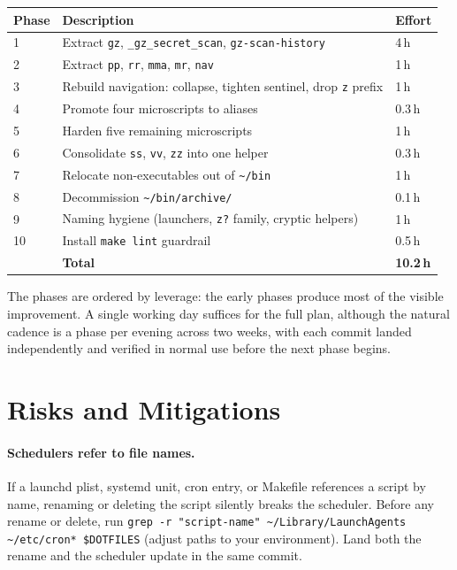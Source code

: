 \documentclass[11pt,letterpaper]{scrartcl}
\begin{document}
\begin{longtable}{@{}lll@{}}
  \toprule
  \textbf{Phase} & \textbf{Description}                                  & \textbf{Effort} \\
  \midrule
  1 & Extract \texttt{gz}, \texttt{\_gz\_secret\_scan}, \texttt{gz-scan-history} & 4\,h            \\
  2 & Extract \texttt{pp}, \texttt{rr}, \texttt{mma}, \texttt{mr}, \texttt{nav}  & 1\,h            \\
  3 & Rebuild navigation: collapse, tighten sentinel, drop \texttt{z} prefix     & 1\,h            \\
  4 & Promote four microscripts to aliases                                       & 0.3\,h          \\
  5 & Harden five remaining microscripts                                         & 1\,h            \\
  6 & Consolidate \texttt{ss}, \texttt{vv}, \texttt{zz} into one helper          & 0.3\,h          \\
  7 & Relocate non-executables out of \texttt{\textasciitilde/bin}               & 1\,h            \\
  8 & Decommission \texttt{\textasciitilde/bin/archive/}                         & 0.1\,h          \\
  9 & Naming hygiene (launchers, \texttt{z?} family, cryptic helpers)            & 1\,h            \\
  10 & Install \texttt{make lint} guardrail                                      & 0.5\,h          \\
  \midrule
    & \textbf{Total}                                                             & \textbf{10.2\,h} \\
  \bottomrule
\end{longtable}

The phases are ordered by leverage: the early phases produce most
of the visible improvement. A single working day suffices for the
full plan, although the natural cadence is a phase per evening
across two weeks, with each commit landed independently and
verified in normal use before the next phase begins.

\section{Risks and Mitigations}

\paragraph{Schedulers refer to file names.}
If a launchd plist, systemd unit, cron entry, or Makefile
references a script by name, renaming or deleting the script
silently breaks the scheduler. Before any rename or delete, run
\texttt{grep -r "script-name" \textasciitilde/Library/LaunchAgents
\textasciitilde/etc/cron* \$DOTFILES} (adjust paths to your
environment). Land both the rename and the scheduler update in
the same commit.
\end{document}
